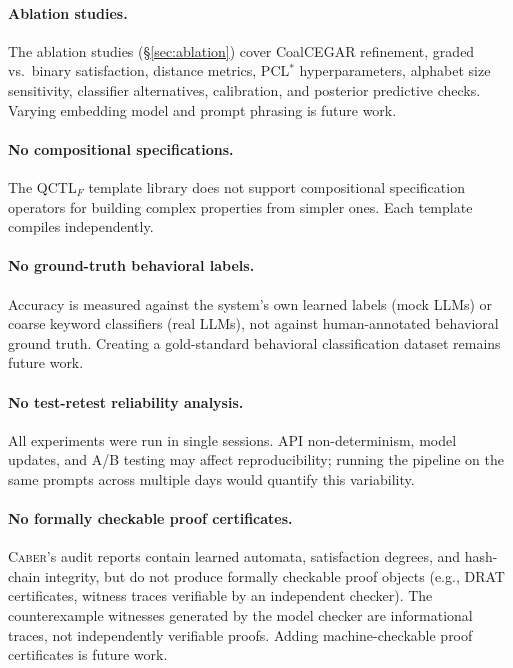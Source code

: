 \documentclass[11pt]{article}
\newcommand{\tool}{\textsc{Caber}}
\newcommand{\pclstar}{PCL$^*$}
\newcommand{\qctlf}{QCTL$_F$}
\begin{document}
\paragraph{Ablation studies.}
The ablation studies (\S\ref{sec:ablation}) cover CoalCEGAR
refinement, graded vs.\ binary satisfaction, distance metrics,
\pclstar{} hyperparameters, alphabet size sensitivity,
classifier alternatives, calibration, and posterior predictive
checks.  Varying embedding model and prompt phrasing is future work.

\paragraph{No compositional specifications.}
The \qctlf{} template library does not support compositional
specification operators for building complex properties from simpler
ones.  Each template compiles independently.

\paragraph{No ground-truth behavioral labels.}
Accuracy is measured against the system's own learned labels (mock
LLMs) or coarse keyword classifiers (real LLMs), not against
human-annotated behavioral ground truth.  Creating a gold-standard
behavioral classification dataset remains future work.

\paragraph{No test-retest reliability analysis.}
All experiments were run in single sessions.  API non-determinism,
model updates, and A/B testing may affect reproducibility; running
the pipeline on the same prompts across multiple days would quantify
this variability.

\paragraph{No formally checkable proof certificates.}
\tool{}'s audit reports contain learned automata, satisfaction degrees,
and hash-chain integrity, but do not produce formally checkable proof
objects (e.g., DRAT certificates, witness traces verifiable by an
independent checker).  The counterexample witnesses generated by the
model checker are informational traces, not independently verifiable
proofs.  Adding machine-checkable proof certificates is future work.
\end{document}
